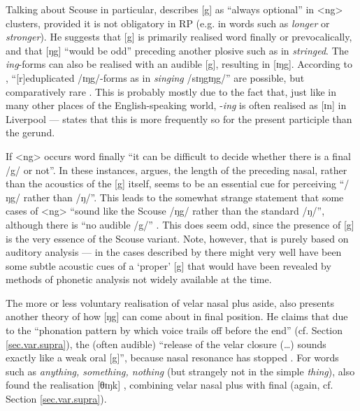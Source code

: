 Talking about Scouse in particular, \textcite[293]{knowles1973} describes [g] as ``always optional'' in <ng> clusters, provided it is not obligatory in RP (e.g. in words such as \emph{longer} or \emph{stronger}).
He suggests that [g] is primarily realised word finally or prevocalically, and that [ŋg] ``would be odd'' \parencite[293]{knowles1973} preceding another plosive such as in \emph{stringed}.
The \emph{ing}-forms can also be realised with an audible [g], resulting in [ɪŋg].
According to \textcite[293]{knowles1973}, ``[r]eduplicated /ɪŋg/-forms as in \emph{singing} /sɪŋgɪŋg/'' are possible, but comparatively rare \citep[cf.][293]{knowles1973}.
This is probably mostly due to the fact that, just like in many other places of the English-speaking world, -\emph{ing} is often realised as [ɪn] in Liverpool --- \textcite[cf.][156]{knowles1973} states that this is more frequently so for the present participle than the gerund.

If <ng> occurs word finally ``it can be difficult to decide whether there is a final /g/ or not''.
In these instances, \citeauthor{knowles1973} argues, the length of the preceding nasal, rather than the acoustics of the [g] itself, seems to be an essential cue for perceiving ``/ŋg/ rather than /ŋ/''.
This leads \citeauthor{knowles1973} to the somewhat strange statement that some cases of <ng> ``sound like the Scouse /ŋg/ rather than the standard /ŋ/'', although there is ``no audible /g/'' \citep[293]{knowles1973}.
This does seem odd, since the presence of [g] is the very essence of the Scouse variant.
Note, however, that \citealt{knowles1973} is purely based on auditory analysis --- in the cases described by \citeauthor{knowles1973} there might very well have been some subtle acoustic cues of a `proper' [g] that would have been revealed by methods of phonetic analysis not widely available at the time.

The more or less voluntary realisation of velar nasal plus aside, \cite{knowles1973} also presents another theory of how [ŋg] can come about in final position.
He claims that due to the ``phonation pattern by which voice trails off before the end'' (cf. Section \ref{sec.var.supra}), the (often audible) ``release of the velar closure (\ldots) sounds exactly like a weak oral [g]'', because nasal resonance has stopped \citep[cf.][294]{knowles1973}.
For words such as \emph{anything, something, nothing} (but strangely not in the simple \emph{thing}), \textcite[cf.][156]{knowles1973} also found the realisation [θɪŋk] , combining velar nasal plus with final  (again, cf. Section \ref{sec.var.supra}).

